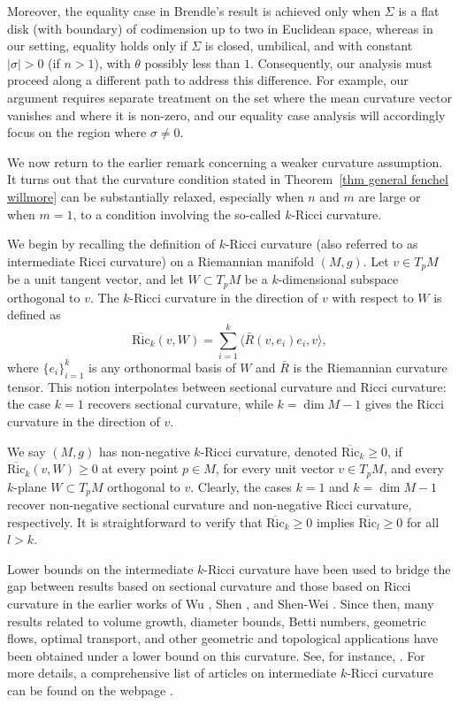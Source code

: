 \documentclass[11pt, reqno]{amsart}
\numberwithin{equation}{section}
\begin{document}
Moreover, the equality case in Brendle's result is achieved only when $\Sigma$ is a flat disk (with boundary) of codimension up to two in Euclidean space, whereas in our setting, equality holds only if $\Sigma$ is closed, umbilical, and with constant $|\sigma|>0$ (if $n>1$), with $\theta$ possibly less than $1$. Consequently, our analysis must proceed along a different path to address this difference. For example, our argument requires separate treatment on the set where the mean curvature vector vanishes and where it is non-zero, and our equality case analysis will accordingly focus on the region where $\sigma\ne 0$.

We now return to the earlier remark concerning a weaker curvature assumption. It turns out that the curvature condition stated in Theorem~\ref{thm general fenchel willmore} can be substantially relaxed, especially when $n$ and $m$ are large or when $m=1$, to a condition involving the so-called $k$-Ricci curvature.

We begin by recalling the definition of $k$-Ricci curvature (also referred to as intermediate Ricci curvature) on a Riemannian manifold $(M, g)$. Let $v \in T_pM$ be a unit tangent vector, and let $W \subset T_pM$ be a $k$-dimensional subspace orthogonal to $v$. The $k$-Ricci curvature in the direction of $v$ with respect to $W$ is defined as
$$\overline{\mathrm{Ric}}_k(v, W) = \sum_{i=1}^{k} \langle \bar{R}(v, e_i)e_i, v \rangle, $$
where $\{e_i\}_{i=1}^{k}$ is any orthonormal basis of $W$ and $\bar R$ is the Riemannian curvature tensor. This notion interpolates between sectional curvature and Ricci curvature: the case $k=1$ recovers sectional curvature, while $k = \dim M - 1$ gives the Ricci curvature in the direction of $v$.

We say $(M, g)$ has non-negative $k$-Ricci curvature, denoted $\overline{\mathrm{Ric}}_k \ge 0$, if $\overline{\mathrm{Ric}}_k(v, W) \ge 0$ at every point $p \in M$, for every unit vector $v \in T_pM$, and every $k$-plane $W \subset T_pM$ orthogonal to $v$. Clearly, the cases $k=1$ and $k=\dim M-1$ recover non-negative sectional curvature and non-negative Ricci curvature, respectively. It is straightforward to verify that $\overline{\mathrm{Ric}}_k \ge 0$ implies $\overline{\mathrm{Ric}}_l \ge 0$ for all $l > k$.

Lower bounds on the intermediate $k$-Ricci curvature have been used to bridge the gap between results based on sectional curvature and those based on Ricci curvature in the earlier works of Wu \cite{Wu1979}, Shen \cite{Shen1993}, and Shen-Wei \cite{ShenWei1993}. Since then, many results related to volume growth, diameter bounds, Betti numbers, geometric flows, optimal transport, and other geometric and topological applications have been obtained under a lower bound on this curvature. See, for instance, \cites{BrendleHuisken2017, GuijarroWilhelm2018, Chahine2019, KettererMondino2018}. For more details, a comprehensive list of articles on intermediate $k$-Ricci curvature can be found on the webpage \cite{IntermediateRicciCurvatureList}.
\end{document}
